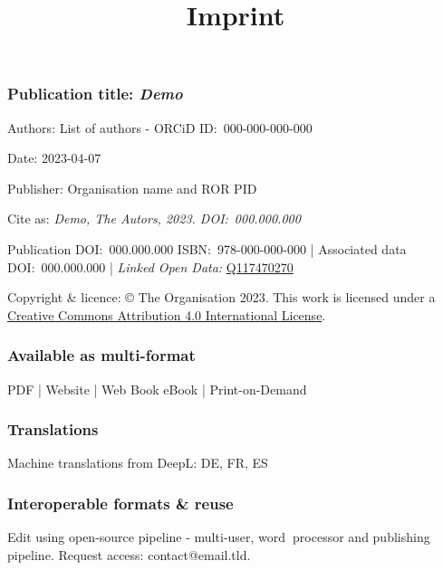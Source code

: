 \documentclass{article}
\begin{document}
\title{Imprint}

\maketitle


\subsubsection{Publication title: \emph{Demo }}\label{H6864698}



Authors: List of authors - ORCiD ID: 000-000-000-000


Date: 2023-04-07


Publisher: Organisation name and ROR PID


Cite as: \emph{Demo, The Autors, 2023. DOI:} \emph{000.000.000}


Publication DOI: 000.000.000 ISBN: 978-000-000-000 | Associated data DOI: 000.000.000 | \emph{Linked Open Data: }\href{https://www.wikidata.org/wiki/Q117470270}{Q117470270}


Copyright \& licence: © The Organisation 2023. This work is licensed under a \href{https://creativecommons.org/licenses/by/4.0/}{Creative Commons Attribution 4.0 International License}.


\subsubsection{Available as multi-format}\label{H8085668}



PDF | Website | Web Book eBook | Print-on-Demand 


\subsubsection{Translations}\label{H5866075}



Machine translations from DeepL: DE, FR, ES 


\subsubsection{Interoperable formats \& reuse}\label{H4022411}



Edit using open-source pipeline - multi‑user, word\textbf{ }processor and publishing pipeline. Request access: contact@email.tld.
\end{document}
